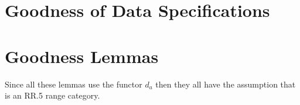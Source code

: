 \documentclass[10pt,a4paper]{article}
\theoremstyle{remark}
\newcommand{\srcFolder}{src}
\begin{document}
%



 







\section{Goodness of Data Specifications}



\section{Goodness Lemmas}
\begin{aside}
Since all these lemmas use the functor $d_a$ then they all have the assumption that
\catcw is an RR.5 range category.
\end{aside}







 


\printindex[lemmas]
\end{document}
